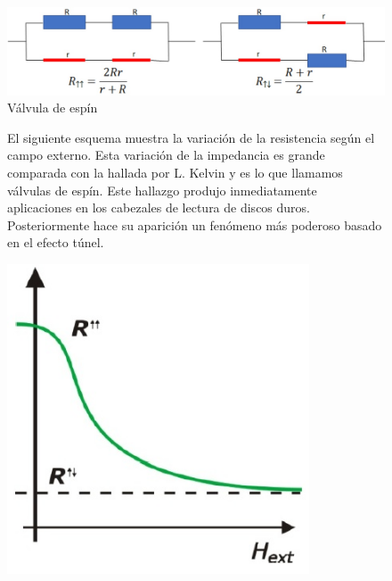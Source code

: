\begin{figure}[H]
    \centering
    \includegraphics[width=1.0\textwidth]{./Figures/fig338}
	\caption{Válvula de espín}
	\label{fig:338}
\end{figure}

\begin{figure}[H]
  \begin{minipage}[b]{0.47\textwidth}
El siguiente esquema muestra la variación de la resistencia según el campo externo. Esta variación de la impedancia es grande comparada con la hallada por L. Kelvin y es lo que llamamos válvulas de espín. Este hallazgo produjo inmediatamente aplicaciones en los cabezales de lectura de discos duros. Posteriormente hace su aparición un fenómeno más poderoso basado en el efecto túnel.
  \vspace{0cm}
  \end{minipage}
  \hfill
  \begin{minipage}[b]{0.47\textwidth}
     \includegraphics[width=0.8\textwidth]{./Figures/fig339}
	\label{fig:339}
	  \vspace{0cm}
  \end{minipage}
\end{figure}


